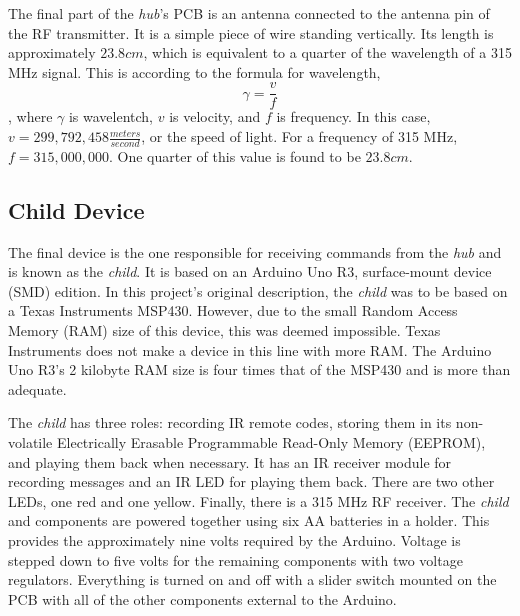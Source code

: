 \documentclass[12pt]{article}
\begin{document}
The final part of the \emph{hub}'s PCB is an antenna connected to the antenna pin of the RF transmitter. It is a simple piece of wire standing vertically. Its length is approximately $23.8 cm$, which is equivalent to a quarter of the wavelength of a 315 MHz signal. This is according to the formula for wavelength, 
\[\gamma=\frac{v}{f}\]
\cite{wavelength}, where $\gamma$ is wavelentch, $v$ is velocity, and $f$ is frequency. In this case, $v=299,792,458 \frac{meters}{second}$, or the speed of light. For a frequency of 315 MHz, $f=315,000,000$. One quarter of this value is found to be $23.8 cm$.
 
 \subsection*{Child Device}
 
 The final device is the one responsible for receiving commands from the \emph{hub} and is known as the \emph{child}. It is based on an Arduino Uno R3, surface-mount device (SMD) edition. In this project's original description, the \emph{child} was to be based on a Texas Instruments MSP430. However, due to the small Random Access Memory (RAM) size of this device, this was deemed impossible. Texas Instruments does not make a device in this line with more RAM. The Arduino Uno R3's 2 kilobyte RAM size is four times that of the MSP430 and is more than adequate. 
 
 The \emph{child} has three roles: recording IR remote codes, storing them in its non-volatile Electrically Erasable Programmable Read-Only Memory (EEPROM), and playing them back when necessary. It has an IR receiver module for recording messages and an IR LED for playing them back. There are two other LEDs, one red and one yellow. Finally, there is a 315 MHz RF receiver. The \emph{child} and components are powered together using six AA batteries in a holder. This provides the approximately nine volts required by the Arduino. Voltage is stepped down to five volts for the remaining components with two voltage regulators. Everything is turned on and off with a slider switch mounted on the PCB with all of the other components external to the Arduino.
 
\end{document}
